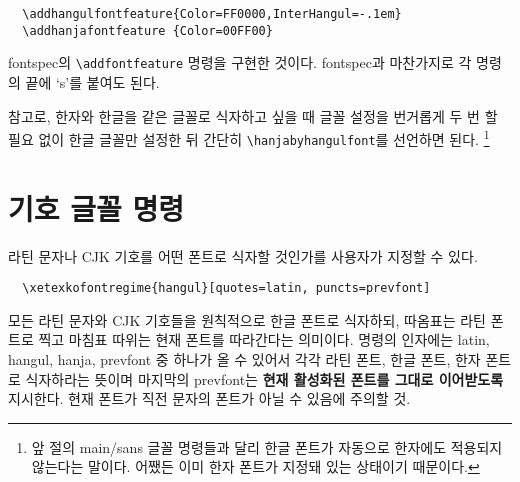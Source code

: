 \documentclass[a4paper]{article}
\def\cs#1{\texttt{\textbackslash #1}}
\def\hemph#1{\textsf{\bfseries #1}}
\begin{document}
\begin{verbatim}
  \addhangulfontfeature{Color=FF0000,InterHangul=-.1em}
  \addhanjafontfeature {Color=00FF00}
\end{verbatim}
fontspec의 \verb+\addfontfeature+ 명령을 구현한 것이다.
fontspec과 마찬가지로 각 명령의 끝에 `s'를 붙여도 된다.

참고로, 한자와 한글을 같은 글꼴로 식자하고 싶을 때 글꼴 설정을
번거롭게 두 번 할 필요 없이 한글 글꼴만 설정한 뒤 간단히
\cs{hanjabyhangulfont}를 선언하면 된다.%
\footnote{앞 절의 main/sans 글꼴 명령들과 달리 한글 폰트가 자동으로
  한자에도 적용되지 않는다는 말이다. 어쨌든 이미 한자 폰트가 지정돼 있는
  상태이기 때문이다.}


\section{기호 글꼴 명령}\label{sec:symbolfont}
라틴 문자나 CJK 기호를 어떤 폰트로 식자할 것인가를 사용자가 지정할 수 있다.
\begin{verbatim}
  \xetexkofontregime{hangul}[quotes=latin, puncts=prevfont]
\end{verbatim}
모든 라틴 문자와 CJK 기호들을 원칙적으로 한글 폰트로 식자하되,
따옴표는 라틴 폰트로 찍고 마침표 따위는 현재 폰트를 따라간다는 의미이다.
명령의 인자에는 latin, hangul, hanja, prevfont 중 하나가 올 수 있어서
각각 라틴 폰트, 한글 폰트, 한자 폰트로 식자하라는 뜻이며
마지막의 prevfont는 \hemph{현재 활성화된 폰트를 그대로 이어받도록} 지시한다.
현재 폰트가 직전 문자의 폰트가 아닐 수 있음에 주의할 것.
\end{document}
